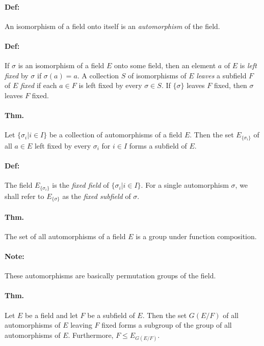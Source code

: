 \documentclass[10pt,a4paper]{article}
\begin{document}
\paragraph{Def:} An isomorphism of a field onto itself is an \textit{automorphism} of the field.

\paragraph{Def:} If $\sigma$ is an isomorphism of a field $E$ onto some field, then an element $a$ of $E$ is \textit{left fixed} by $\sigma$ if $\sigma(a) = a$. A collection $S$ of isomorphisms of $E$ \textit{leaves} a subfield $F$ of $E$ \textit{fixed} if each $a \in F$ is left fixed by every $\sigma \in S$. If $\{\sigma\}$ leaves $F$ fixed, then $\sigma$ leaves $F$ fixed.

\paragraph{Thm.} Let $\{ \sigma_i | i \in I \}$ be a collection of automorphisms of a field $E$. Then the set $E_{\{\sigma_i\}}$ of all $a \in E$ left fixed by every $\sigma_i$ for $i \in I$ forms a subfield of $E$.

\paragraph{Def:} The field $E_{\{\sigma_i\}}$ is the \textit{fixed field} of $\{\sigma_i | i \in I \}$. For a single automorphism $\sigma$, we shall refer to $E_{\{\sigma\}}$ as the \textit{fixed subfield} of $\sigma$.

\paragraph{Thm.} The set of all automorphisms of a field $E$ is a group under function composition.

\paragraph{Note:} These automorphisms are basically permutation groups of the field.

\paragraph{Thm.} Let $E$ be a field and let $F$ be a subfield of $E$. Then the set $G(E/F)$ of all automorphisms of $E$ leaving $F$ fixed forms a subgroup of the group of all automorphisms of $E$. Furthermore, $F \leq E_{G(E/F)}$.
\end{document}
